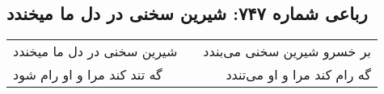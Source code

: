 \begin{center}
\section*{رباعی شماره ۷۴۷: شیرین سخنی در دل ما میخندد}
\label{sec:0747}
\begin{longtable}{l p{0.5cm} r}
شیرین سخنی در دل ما میخندد
&&
بر خسرو شیرین سخنی می‌بندد
\\
گه تند کند مرا و او رام شود
&&
گه رام کند مرا و او می‌تندد
\\
\end{longtable}
\end{center}
